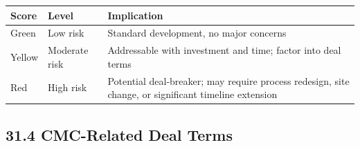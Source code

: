 \documentclass[
  11pt,
  a4paper,
]{report}
\begin{document}
\begin{longtable}[]{@{}lll@{}}
\toprule
\begin{minipage}[b]{0.24\columnwidth}\raggedright
Score\strut
\end{minipage} & \begin{minipage}[b]{0.24\columnwidth}\raggedright
Level\strut
\end{minipage} & \begin{minipage}[b]{0.44\columnwidth}\raggedright
Implication\strut
\end{minipage}\tabularnewline
\midrule
\endhead
\begin{minipage}[t]{0.24\columnwidth}\raggedright
Green\strut
\end{minipage} & \begin{minipage}[t]{0.24\columnwidth}\raggedright
Low risk\strut
\end{minipage} & \begin{minipage}[t]{0.44\columnwidth}\raggedright
Standard development, no major concerns\strut
\end{minipage}\tabularnewline
\begin{minipage}[t]{0.24\columnwidth}\raggedright
Yellow\strut
\end{minipage} & \begin{minipage}[t]{0.24\columnwidth}\raggedright
Moderate risk\strut
\end{minipage} & \begin{minipage}[t]{0.44\columnwidth}\raggedright
Addressable with investment and time; factor into deal terms\strut
\end{minipage}\tabularnewline
\begin{minipage}[t]{0.24\columnwidth}\raggedright
Red\strut
\end{minipage} & \begin{minipage}[t]{0.24\columnwidth}\raggedright
High risk\strut
\end{minipage} & \begin{minipage}[t]{0.44\columnwidth}\raggedright
Potential deal-breaker; may require process redesign, site change, or
significant timeline extension\strut
\end{minipage}\tabularnewline
\bottomrule
\end{longtable}

\hypertarget{cmc-related-deal-terms}{%
\subsection{31.4 CMC-Related Deal Terms}\label{cmc-related-deal-terms}}
\end{document}
